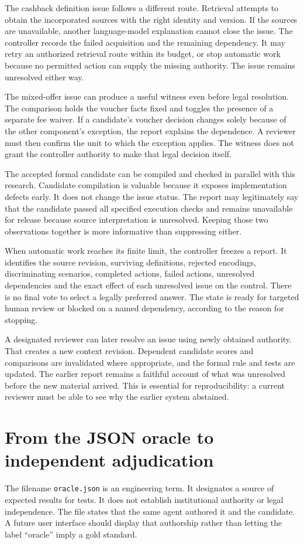\documentclass[12pt,a4paper,oneside,openany]{book}
\begin{document}
The cashback definition issue follows a different route. Retrieval attempts to
obtain the incorporated sources with the right identity and version. If the
sources are unavailable, another language-model explanation cannot close the
issue. The controller records the failed acquisition and the remaining
dependency. It may retry an authorized retrieval route within its budget, or
stop automatic work because no permitted action can supply the missing
authority. The issue remains unresolved either way.

The mixed-offer issue can produce a useful witness even before legal resolution.
The comparison holds the voucher facts fixed and toggles the presence of a
separate fee waiver. If a candidate's voucher decision changes solely because
of the other component's exception, the report explains the dependence. A
reviewer must then confirm the unit to which the exception applies. The witness
does not grant the controller authority to make that legal decision itself.

The accepted formal candidate can be compiled and checked in parallel with this
research. Candidate compilation is valuable because it exposes implementation
defects early. It does not change the issue status. The report may legitimately
say that the candidate passed all specified execution checks and remains
unavailable for release because source interpretation is unresolved. Keeping
those two observations together is more informative than suppressing either.

When automatic work reaches its finite limit, the controller freezes a report.
It identifies the source revision, surviving definitions, rejected encodings,
discriminating scenarios, completed actions, failed actions, unresolved
dependencies and the exact effect of each unresolved issue on the control.
There is no final vote to select a legally preferred answer. The state is ready
for targeted human review or blocked on a named dependency, according to the
reason for stopping.

A designated reviewer can later resolve an issue using newly obtained authority.
That creates a new context revision. Dependent candidate scores and comparisons
are invalidated where appropriate, and the formal rule and tests are updated.
The earlier report remains a faithful account of what was unresolved before the
new material arrived. This is essential for reproducibility: a current reviewer
must be able to see why the earlier system abstained.

\section{From the JSON oracle to independent adjudication}
\label{sec:circular-independent}
The filename \texttt{oracle.json} is an engineering term. It designates a source
of expected results for tests. It does not establish institutional authority or
legal independence. The file states that the same agent authored it and the
candidate. A future user interface should display that authorship rather than
letting the label ``oracle'' imply a gold standard.
\end{document}
